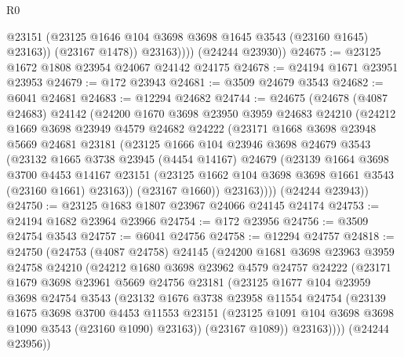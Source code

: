 \begin{lexlean}{R0}
\begin{coremodule}
                  @23151
                  (@23125 @1646 @104 @3698 @3698 @1645 @3543 (@23160 @1645) @23163))
                (@23167 @1478))
              @23163))))
      (@24244 @23930))
@24675 := @23125 @1672 @1808 @23954 @24067 @24142 @24175
@24678 := @24194 @1671 @23951 @23953
@24679 := @172 @23943
@24681 := @3509 @24679 @3543
@24682 := @6041 @24681
@24683 := @12294 @24682
@24744 := @24675
    (@24678
      (@4087 @24683)
      @24142
      (@24200
        @1670
        @3698
        @23950
        @3959
        @24683
        @24210
        (@24212
          @1669
          @3698
          @23949
          @4579
          @24682
          @24222
          (@23171
            @1668
            @3698
            @23948
            @5669
            @24681
            @23181
            (@23125
              @1666
              @104
              @23946
              @3698
              @24679
              @3543
              (@23132
                @1665
                @3738
                @23945
                (@4454 @14167)
                @24679
                (@23139
                  @1664
                  @3698
                  @3700
                  @4453
                  @14167
                  @23151
                  (@23125 @1662 @104 @3698 @3698 @1661 @3543 (@23160 @1661) @23163))
                (@23167 @1660))
              @23163))))
      (@24244 @23943))
@24750 := @23125 @1683 @1807 @23967 @24066 @24145 @24174
@24753 := @24194 @1682 @23964 @23966
@24754 := @172 @23956
@24756 := @3509 @24754 @3543
@24757 := @6041 @24756
@24758 := @12294 @24757
@24818 := @24750
    (@24753
      (@4087 @24758)
      @24145
      (@24200
        @1681
        @3698
        @23963
        @3959
        @24758
        @24210
        (@24212
          @1680
          @3698
          @23962
          @4579
          @24757
          @24222
          (@23171
            @1679
            @3698
            @23961
            @5669
            @24756
            @23181
            (@23125
              @1677
              @104
              @23959
              @3698
              @24754
              @3543
              (@23132
                @1676
                @3738
                @23958
                @11554
                @24754
                (@23139
                  @1675
                  @3698
                  @3700
                  @4453
                  @11553
                  @23151
                  (@23125 @1091 @104 @3698 @3698 @1090 @3543 (@23160 @1090) @23163))
                (@23167 @1089))
              @23163))))
      (@24244 @23956))

\end{coremodule}
\end{lexlean}
